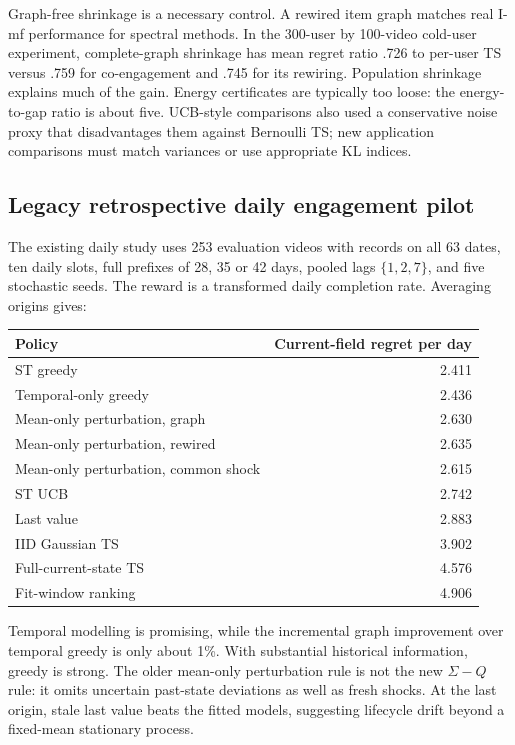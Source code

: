Graph-free shrinkage is a necessary control. A rewired item graph matches real I-mf performance for spectral methods. In the 300-user by 100-video cold-user experiment, complete-graph shrinkage has mean regret ratio .726 to per-user TS versus .759 for co-engagement and .745 for its rewiring. Population shrinkage explains much of the gain. Energy certificates are typically too loose: the energy-to-gap ratio is about five. UCB-style comparisons also used a conservative noise proxy that disadvantages them against Bernoulli TS; new application comparisons must match variances or use appropriate KL indices.

\subsection{Legacy retrospective daily engagement pilot}
The existing daily study uses 253 evaluation videos with records on all 63 dates, ten daily slots, full prefixes of 28, 35 or 42 days, pooled lags $\{1,2,7\}$, and five stochastic seeds. The reward is a transformed daily completion rate. Averaging origins gives:
\begin{center}\small
\begin{tabular}{lr}
\toprule Policy & Current-field regret per day \\
\midrule
ST greedy & 2.411 \\
Temporal-only greedy & 2.436 \\
Mean-only perturbation, graph & 2.630 \\
Mean-only perturbation, rewired & 2.635 \\
Mean-only perturbation, common shock & 2.615 \\
ST UCB & 2.742 \\
Last value & 2.883 \\
IID Gaussian TS & 3.902 \\
Full-current-state TS & 4.576 \\
Fit-window ranking & 4.906 \\
\bottomrule
\end{tabular}\end{center}
Temporal modelling is promising, while the incremental graph improvement over temporal greedy is only about 1\%. With substantial historical information, greedy is strong. The older mean-only perturbation rule is not the new $\Sigma-Q$ rule: it omits uncertain past-state deviations as well as fresh shocks. At the last origin, stale last value beats the fitted models, suggesting lifecycle drift beyond a fixed-mean stationary process.

